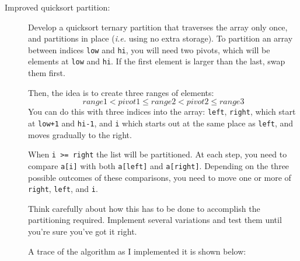 \documentclass{article}
\begin{document}
\begin{description}
\item[Improved quicksort partition:] Develop a quicksort ternary partition that traverses
the array only once, and partitions in place ({\em i.e.} using no extra storage).  To partition
an array between indices \lstinline{low} and \lstinline{hi}, you will
need two pivots, which will be elements at \lstinline{low} and \lstinline{hi}.  If the
first element is larger than the last, swap them first.

Then, the idea is to create three ranges of elements:
\[ range1 < pivot1 \leq range2 < pivot2 \leq range3 \]
You can do this with three indices into the array: \lstinline{left}, \lstinline{right},
which start at \lstinline{low+1} and \lstinline{hi-1}, and \lstinline{i} which starts
out at the same place as \lstinline{left}, and moves gradually to the right.

When \lstinline{i >= right} the list will be partitioned.  At each step,
you need to compare \lstinline{a[i]} with both \lstinline{a[left]}
and \lstinline{a[right]}.  Depending on the three possible outcomes
of these comparisons, you need to move one or more of
\lstinline{right}, \lstinline{left}, and \lstinline{i}.

Think carefully about how this has to be done to accomplish the
partitioning required.  Implement several variations and test them
until you're sure you've got it right.

A trace of the algorithm as I implemented it is shown below:


\end{description}
\end{document}
